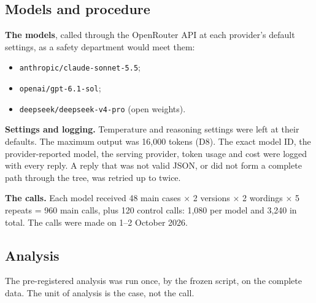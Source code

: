 \documentclass[11pt]{article}
\providecommand{\tightlist}{\setlength{\itemsep}{0pt}\setlength{\parskip}{0pt}}
\begin{document}
\hypertarget{models-and-procedure}{%
\subsection{Models and procedure}\label{models-and-procedure}}

\textbf{The models}, called through the OpenRouter API at each provider's default settings, as a safety department would meet them:

\begin{itemize}
\tightlist
\item
  \texttt{anthropic/claude-sonnet-5.5};
\item
  \texttt{openai/gpt-6.1-sol};
\item
  \texttt{deepseek/deepseek-v4-pro} (open weights).
\end{itemize}

\textbf{Settings and logging.} Temperature and reasoning settings were left at their defaults. The maximum output was 16,000 tokens (D8). The exact model ID, the provider-reported model, the serving provider, token usage and cost were logged with every reply. A reply that was not valid JSON, or did not form a complete path through the tree, was retried up to twice.

\textbf{The calls.} Each model received 48 main cases × 2 versions × 2 wordings × 5 repeats = 960 main calls, plus 120 control calls: 1,080 per model and 3,240 in total. The calls were made on 1--2 October 2026.

\hypertarget{analysis}{%
\subsection{Analysis}\label{analysis}}

The pre-registered analysis was run once, by the frozen script, on the complete data. The unit of analysis is the case, not the call.
\end{document}
